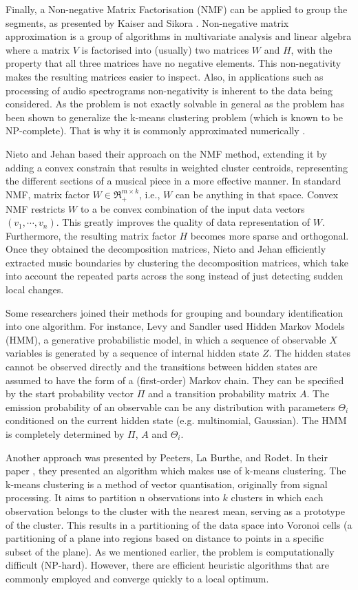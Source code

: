 Finally, a Non-negative Matrix Factorisation (NMF) can be applied to group the segments, as presented by Kaiser and Sikora \cite{Sikora}. Non-negative matrix approximation is a group of algorithms in multivariate analysis and linear algebra where a matrix $V$ is factorised into (usually) two matrices $W$ and $H$, with the property that all three matrices have no negative elements. This non-negativity makes the resulting matrices easier to inspect. Also, in applications such as processing of audio spectrograms non-negativity is inherent to the data being considered. As the problem is not exactly solvable in general as the problem has been shown to generalize the k-means clustering problem (which is known to be NP-complete). That is why it is commonly approximated numerically \cite{NMFNP}.

Nieto and Jehan \cite{Nieto} based their approach on the NMF method, extending it by adding a convex constrain that results in weighted cluster centroids, representing the different sections of a musical piece in a more effective manner. 
In standard NMF, matrix factor $W \in \Re^{m \times k}_{+}$, i.e., $W$ can be anything in that space. Convex NMF restricts $W$ to a be convex combination of the input data vectors  $(v_1, \cdots, v_n)$. This greatly improves the quality of data representation of $W$. Furthermore, the resulting matrix factor $H$ becomes more sparse and orthogonal. Once they obtained the decomposition matrices, Nieto and Jehan efficiently extracted music boundaries by clustering the decomposition matrices, which take into account the repeated parts across the song instead of just detecting sudden local changes.

Some researchers joined their methods for grouping and boundary identification into one algorithm. For instance, Levy and Sandler used Hidden Markov Models (HMM), a generative probabilistic model, in which a sequence of observable $X$ variables is generated by a sequence of internal hidden state $Z$. The hidden states cannot be observed directly and the transitions between hidden states are assumed to have the form of a (first-order) Markov chain. They can be specified by the start probability vector $\Pi$ and a transition probability matrix $A$. The emission probability of an observable can be any distribution with parameters $\Theta_{i}$ conditioned on the current hidden state (e.g. multinomial, Gaussian). The HMM is completely determined by $\Pi$, $A$ and $\Theta_{i}$.

Another approach was presented by Peeters, La Burthe, and Rodet. In their paper \cite{Peeters}, they presented an algorithm which makes use of k-means clustering. The k-means clustering is a method of vector quantisation, originally from signal processing. It aims to partition n observations into $k$ clusters in which each observation belongs to the cluster with the nearest mean, serving as a prototype of the cluster. This results in a partitioning of the data space into Voronoi cells (a partitioning of a plane into regions based on distance to points in a specific subset of the plane).
As we mentioned earlier, the problem is computationally difficult (NP-hard). However, there are efficient heuristic algorithms that are commonly employed and converge quickly to a local optimum.

